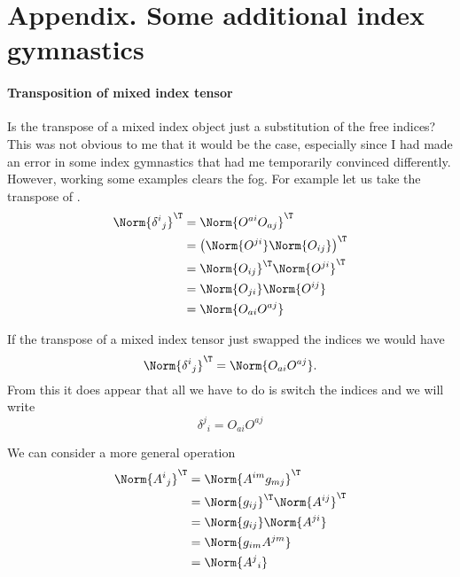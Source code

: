 \section{Appendix. Some additional index gymnastics}
%
\paragraph{Transposition of mixed index tensor}
%
Is the transpose of a mixed index object just a substitution of the free indices?  This was not obvious to me that it would be the case, especially since I had made an error in some index gymnastics that had me temporarily convinced differently.  However, working some examples clears the fog.  For example let us take the transpose of .
%
\begin{equation}\label{eqn:relativisticElectrodynamicsL11b:1440}
\begin{aligned}
\Norm{ {\delta^i}_j }^\T
&=
\Norm{ O^{a i} O_{a j} }^\T \\
&=
\left( \Norm{ O^{j i} } \Norm{ O_{i j} } \right)^\T \\
&=
\Norm{ O_{i j} }^\T
\Norm{ O^{j i} }^\T  \\
&=
\Norm{ O_{j i} }
\Norm{ O^{i j} } \\
&=
\Norm{ O_{a i} O^{a j} } \\
\end{aligned}
\end{equation}

If the transpose of a mixed index tensor just swapped the indices we would have
%
\begin{equation}\label{eqn:relativisticElectrodynamicsL11:1060}
\Norm{ {\delta^i}_j }^\T = \Norm{ O_{a i} O^{a j} }.
\end{equation}
From this it does appear that all we have to do is switch the indices and we will write
\begin{equation}\label{eqn:relativisticElectrodynamicsL11:1060b}
{\delta^j}_i = O_{a i} O^{a j}
\end{equation}

We can consider a more general operation
%
\begin{equation}\label{eqn:relativisticElectrodynamicsL11b:1460}
\begin{aligned}
\Norm{{A^i}_j}^\T
&=
\Norm{ A^{i m} g_{m j} }^\T \\
&=
\Norm{ g_{i j} }^\T
\Norm{ A^{i j} }^\T
 \\
&=
\Norm{ g_{i j} }
\Norm{ A^{j i} }
 \\
&=
\Norm{ g_{i m} A^{j m} }
 \\
&=
\Norm{ {A^{j}}_i }
\end{aligned}
\end{equation}

